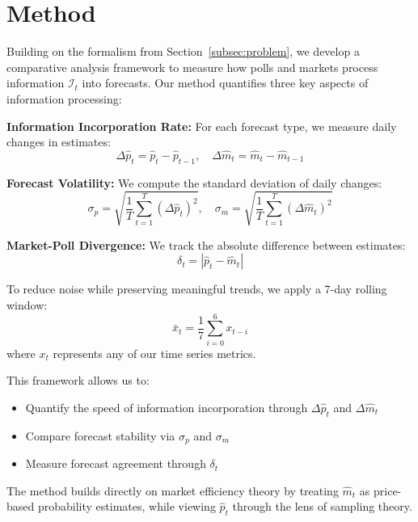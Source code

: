 \documentclass{article} %
\begin{document}
\section{Method}
\label{sec:method}

Building on the formalism from Section~\ref{subsec:problem}, we develop a comparative analysis framework to measure how polls and markets process information $\mathcal{I}_t$ into forecasts. Our method quantifies three key aspects of information processing:

\textbf{Information Incorporation Rate:} For each forecast type, we measure daily changes in estimates:
\begin{equation}
    \Delta \hat{p}_t = \hat{p}_t - \hat{p}_{t-1}, \quad \Delta \hat{m}_t = \hat{m}_t - \hat{m}_{t-1}
\end{equation}

\textbf{Forecast Volatility:} We compute the standard deviation of daily changes:
\begin{equation}
    \sigma_p = \sqrt{\frac{1}{T}\sum_{t=1}^T (\Delta \hat{p}_t)^2}, \quad 
    \sigma_m = \sqrt{\frac{1}{T}\sum_{t=1}^T (\Delta \hat{m}_t)^2}
\end{equation}

\textbf{Market-Poll Divergence:} We track the absolute difference between estimates:
\begin{equation}
    \delta_t = |\hat{p}_t - \hat{m}_t|
\end{equation}

To reduce noise while preserving meaningful trends, we apply a 7-day rolling window:
\begin{equation}
    \bar{x}_t = \frac{1}{7}\sum_{i=0}^6 x_{t-i}
\end{equation}
where $x_t$ represents any of our time series metrics.

This framework allows us to:
\begin{itemize}
    \item Quantify the speed of information incorporation through $\Delta \hat{p}_t$ and $\Delta \hat{m}_t$
    \item Compare forecast stability via $\sigma_p$ and $\sigma_m$
    \item Measure forecast agreement through $\delta_t$
\end{itemize}

The method builds directly on market efficiency theory by treating $\hat{m}_t$ as price-based probability estimates, while viewing $\hat{p}_t$ through the lens of sampling theory.
\end{document}
